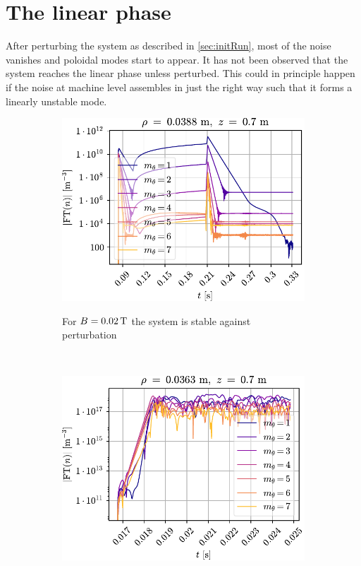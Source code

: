 \section{The linear phase}
%
After perturbing the system as described in \cref{sec:initRun}, most of the noise vanishes and poloidal modes start to appear.
It has not been observed that the system reaches the linear phase unless perturbed.
This could in principle happen if the noise at machine level assembles in just the right way such that it forms a linearly unstable mode.
%
\begin{figure}
    \hspace*{-3cm}
    \begin{subfigure}[h]{1\textwidth}
        \centering
        \includegraphics{fig/results/fourierModes/stable}
        \label{fig:fourierStable}
        \caption{For $B=0.02\, \text{T}$ the system is stable against perturbation}
    \end{subfigure}%
    \\
    \hspace*{-3cm}
    \vspace*{0.5cm}
    \begin{subfigure}[h]{1\textwidth}
        \centering
        \includegraphics{fig/results/fourierModes/unstable}

\end{subfigure}
\end{figure}

